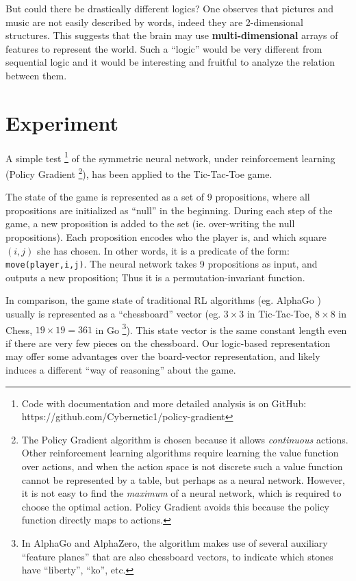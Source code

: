 \documentclass[orivec]{llncs}
\begin{document}
But could there be drastically different logics?  One observes that pictures and music are not easily described by words, indeed they are 2-dimensional structures.  This suggests that the brain may use \textbf{multi-dimensional} arrays of features to represent the world.  Such a ``logic'' would be very different from sequential logic and it would be interesting and fruitful to analyze the relation between them.

\section{Experiment}
\label{sec:experiment}

A simple test \footnote{ Code with documentation and more detailed analysis is on GitHub: https://github.com/Cybernetic1/policy-gradient } of the symmetric neural network, under reinforcement learning (Policy Gradient \footnote{The Policy Gradient algorithm is chosen because it allows \textit{continuous} actions.  Other reinforcement learning algorithms require learning the value function over actions, and when the action space is not discrete such a value function cannot be represented by a table, but perhaps as a neural network.  However, it is not easy to find the \textit{maximum} of a neural network, which is required to choose the optimal action.  Policy Gradient avoids this because the policy function directly maps to actions.}), has been applied to the Tic-Tac-Toe game.

The state of the game is represented as a set of 9 propositions, where all propositions are initialized as ``null'' in the beginning.  During each step of the game, a new proposition is added to the set (ie. over-writing the null propositions).  Each proposition encodes who the player is, and which square $(i,j)$ she has chosen.  In other words, it is a predicate of the form: \texttt{move(player,i,j)}.  The neural network takes 9 propositions as input, and outputs a new proposition;  Thus it is a permutation-invariant function.

In comparison, the game state of traditional RL algorithms (eg. AlphaGo \cite{Silver2016} \cite{Silver2017} \cite{Pumperla2019}) usually is represented as a ``chessboard'' vector (eg. $3 \times 3$ in Tic-Tac-Toe, $8 \times 8$ in Chess, $19 \times 19 = 361$ in Go \footnote{In AlphaGo and AlphaZero, the algorithm makes use of several auxiliary ``feature planes'' that are also chessboard vectors, to indicate which stones have ``liberty'', ``ko'', etc.}).  This state vector is the same constant length even if there are very few pieces on the chessboard.  Our logic-based representation may offer some advantages over the board-vector representation, and likely induces a different ``way of reasoning'' about the game.
\end{document}
